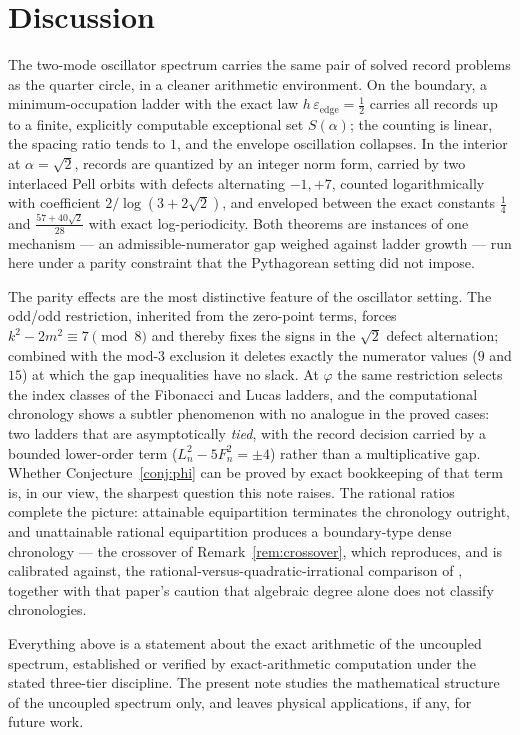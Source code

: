 \documentclass[11pt]{article}
\theoremstyle{definition}
\theoremstyle{remark}
\newcommand{\ee}{\varepsilon_{\mathrm{edge}}}
\begin{document}
\section{Discussion}

The two-mode oscillator spectrum carries the same pair of solved record problems as the quarter circle, in a cleaner arithmetic environment. On the boundary, a minimum-occupation ladder with the exact law $h\,\ee=\tfrac12$ carries all records up to a finite, explicitly computable exceptional set $S(\alpha)$; the counting is linear, the spacing ratio tends to $1$, and the envelope oscillation collapses. In the interior at $\alpha=\sqrt2$, records are quantized by an integer norm form, carried by two interlaced Pell orbits with defects alternating $-1,+7$, counted logarithmically with coefficient $2/\log(3+2\sqrt2)$, and enveloped between the exact constants $\tfrac14$ and $\tfrac{57+40\sqrt2}{28}$ with exact log-periodicity. Both theorems are instances of one mechanism --- an admissible-numerator gap weighed against ladder growth --- run here under a parity constraint that the Pythagorean setting did not impose.

The parity effects are the most distinctive feature of the oscillator setting. The odd/odd restriction, inherited from the zero-point terms, forces $k^2-2m^2\equiv7\pmod 8$ and thereby fixes the signs in the $\sqrt2$ defect alternation; combined with the mod-$3$ exclusion it deletes exactly the numerator values ($9$ and $15$) at which the gap inequalities have no slack. At $\varphi$ the same restriction selects the index classes of the Fibonacci and Lucas ladders, and the computational chronology shows a subtler phenomenon with no analogue in the proved cases: two ladders that are asymptotically \emph{tied}, with the record decision carried by a bounded lower-order term ($L_n^2-5F_n^2=\pm4$) rather than a multiplicative gap. Whether Conjecture~\ref{conj:phi} can be proved by exact bookkeeping of that term is, in our view, the sharpest question this note raises. The rational ratios complete the picture: attainable equipartition terminates the chronology outright, and unattainable rational equipartition produces a boundary-type dense chronology --- the crossover of Remark~\ref{rem:crossover}, which reproduces, and is calibrated against, the rational-versus-quadratic-irrational comparison of \cite{quartercircle}, together with that paper's caution that algebraic degree alone does not classify chronologies.

Everything above is a statement about the exact arithmetic of the uncoupled spectrum, established or verified by exact-arithmetic computation under the stated three-tier discipline. The present note studies the mathematical structure of the uncoupled spectrum only, and leaves physical applications, if any, for future work.
\end{document}
